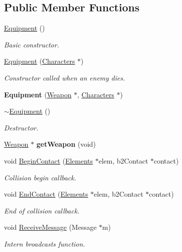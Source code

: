 \subsection*{Public Member Functions}
\begin{DoxyCompactItemize}
\item 
\hyperlink{class_equipment_a2bd67c4254f2074f4f7469f29a20e760}{Equipment} ()
\begin{DoxyCompactList}\small\item\em Basic constructor. \end{DoxyCompactList}\item 
\hyperlink{class_equipment_aeb2356275b65e0d7874aeaee05dc30a4}{Equipment} (\hyperlink{class_characters}{Characters} $\ast$)
\begin{DoxyCompactList}\small\item\em Constructor called when an enemy dies. \end{DoxyCompactList}\item 
\hypertarget{class_equipment_aad2bafad2e0b780e3451da80b5414a62}{{\bfseries Equipment} (\hyperlink{class_weapon}{Weapon} $\ast$, \hyperlink{class_characters}{Characters} $\ast$)}\label{class_equipment_aad2bafad2e0b780e3451da80b5414a62}

\item 
\hypertarget{class_equipment_a3e7f53e57fa3004b5a4490e2c7a1fbaf}{\hyperlink{class_equipment_a3e7f53e57fa3004b5a4490e2c7a1fbaf}{$\sim$\+Equipment} ()}\label{class_equipment_a3e7f53e57fa3004b5a4490e2c7a1fbaf}

\begin{DoxyCompactList}\small\item\em Destructor. \end{DoxyCompactList}\item 
\hypertarget{class_equipment_a54fd1c2d6cca6b4d2584eb0cf8725bd2}{\hyperlink{class_weapon}{Weapon} $\ast$ {\bfseries get\+Weapon} (void)}\label{class_equipment_a54fd1c2d6cca6b4d2584eb0cf8725bd2}

\item 
void \hyperlink{class_equipment_a0c706b45578e8d01fec7b8ee1b773987}{Begin\+Contact} (\hyperlink{class_elements}{Elements} $\ast$elem, b2\+Contact $\ast$contact)
\begin{DoxyCompactList}\small\item\em Collision begin callback. \end{DoxyCompactList}\item 
void \hyperlink{class_equipment_abda1acd976a1c33f3aa398b3a9a64555}{End\+Contact} (\hyperlink{class_elements}{Elements} $\ast$elem, b2\+Contact $\ast$contact)
\begin{DoxyCompactList}\small\item\em End of collision callback. \end{DoxyCompactList}\item 
void \hyperlink{class_equipment_ab195be955597ce6f64c117d675df3af4}{Receive\+Message} (Message $\ast$m)
\begin{DoxyCompactList}\small\item\em Intern broadcasts function. \end{DoxyCompactList}\end{DoxyCompactItemize}
